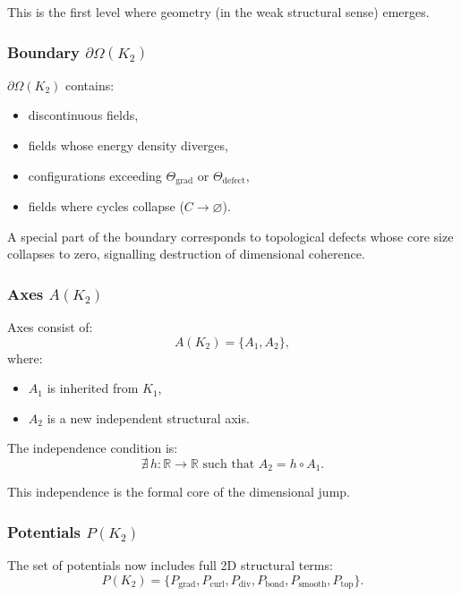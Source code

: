 This is the first level where geometry (in the weak structural sense)
emerges.

\subsubsection{Boundary \texorpdfstring{$\partial\Omega(K_2)$}{\partial\Omega(K_2)}}

$\partial\Omega(K_2)$ contains:
\begin{itemize}
    \item discontinuous fields,
    \item fields whose energy density diverges,
    \item configurations exceeding $\Theta_{\mathrm{grad}}$ or
          $\Theta_{\mathrm{defect}}$,
    \item fields where cycles collapse ($C \to \varnothing$).
\end{itemize}

A special part of the boundary corresponds to topological defects whose
core size collapses to zero, signalling destruction of dimensional
coherence.

\subsubsection{Axes \texorpdfstring{$A(K_2)$}{A(K_2)}}

Axes consist of:
\[
A(K_2) = \{A_1, A_2\},
\]
where:
\begin{itemize}
    \item $A_1$ is inherited from $K_1$,
    \item $A_2$ is a new independent structural axis.
\end{itemize}

The independence condition is:
\[
\nexists\, h: \mathbb{R} \to \mathbb{R} \text{ such that } A_2 = h \circ A_1.
\]

This independence is the formal core of the dimensional jump.

\subsubsection{Potentials \texorpdfstring{$P(K_2)$}{P(K_2)}}

The set of potentials now includes full 2D structural terms:
\[
P(K_2) = 
\{ P_{\mathrm{grad}}, P_{\mathrm{curl}}, P_{\mathrm{div}},
   P_{\mathrm{bond}}, P_{\mathrm{smooth}}, P_{\mathrm{top}} \}.
\]

